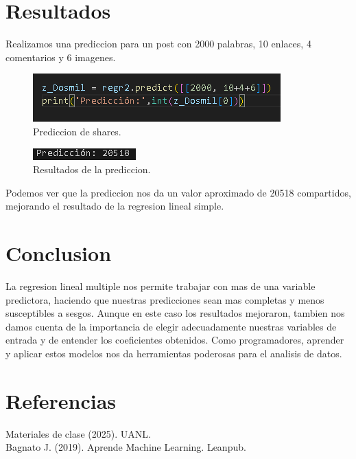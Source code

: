 \documentclass{article}
\begin{document}
\section{Resultados}
Realizamos una prediccion para un post con 2000 palabras, 10 enlaces, 4 comentarios y 6 imagenes.

\begin{figure}[H]
    \centering
    \includegraphics[width=0.8\linewidth]{img/7.png}
    \caption{Prediccion de shares.}
\end{figure}

\begin{figure}[H]
    \centering
    \includegraphics[width=0.8\linewidth]{img/8.png}
    \caption{Resultados de la prediccion.}
\end{figure}

Podemos ver que la prediccion nos da un valor aproximado de 20518 compartidos, mejorando el resultado de la regresion lineal simple.

\section{Conclusion}
La regresion lineal multiple nos permite trabajar con mas de una variable predictora, haciendo que nuestras predicciones sean mas completas y menos susceptibles a sesgos. Aunque en este caso los resultados mejoraron, tambien nos damos cuenta de la importancia de elegir adecuadamente nuestras variables de entrada y de entender los coeficientes obtenidos. Como programadores, aprender y aplicar estos modelos nos da herramientas poderosas para el analisis de datos.

\section{Referencias}
Materiales de clase (2025). UANL.\\
Bagnato J. (2019). Aprende Machine Learning. Leanpub.
\end{document}
